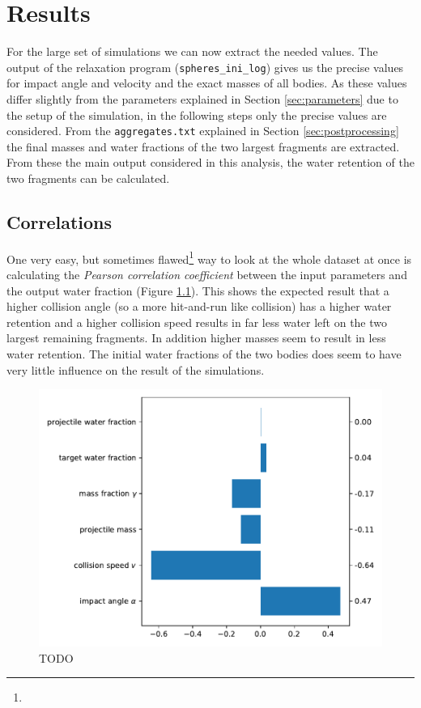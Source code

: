 \chapter{Results}

For the large set of simulations we can now extract the needed values. The output of the relaxation program (\texttt{spheres\_ini\_log}) gives us the precise values for impact angle and velocity and the exact masses of all bodies. As these values differ slightly from the parameters explained in Section \ref{sec:parameters} due to the setup of the simulation, in the following steps only the precise values are considered. From the \texttt{aggregates.txt} explained in Section \ref{sec:postprocessing} the final masses and water fractions of the two largest fragments are extracted. From these the main output considered in this analysis, the water retention of the two fragments can be calculated. 

\section{Correlations}
\label{sec:cov}
One very easy, but sometimes flawed\footnote{} way to look at the whole dataset at once is calculating the \textit{Pearson correlation coefficient} between the input parameters and the output water fraction (Figure \ref{fig:cov}). This shows the expected result that a higher collision angle (so a more hit-and-run like collision) has a higher water retention and a higher collision speed results in far less water left on the two largest remaining fragments. In addition higher masses seem to result in less water retention. The initial water fractions of the two bodies does seem to have very little influence on the result of the simulations.

\begin{figure}
	\centering
	\includegraphics[width=0.8\linewidth]{images/cov.pdf}
	\caption{TODO}
	\label{fig:cov}
\end{figure}